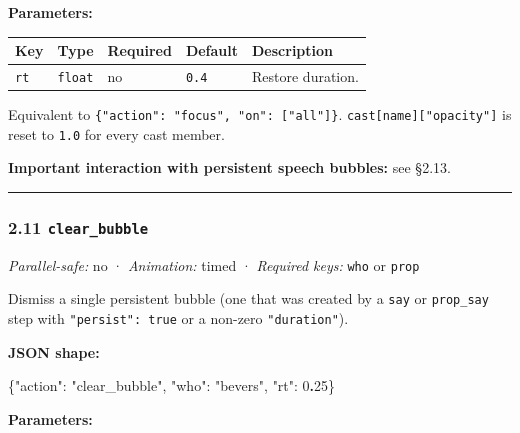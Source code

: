 \documentclass[
  12pt,
  letterpaper,
]{book}
\newenvironment{Shaded}{}{}
\newcommand{\DataTypeTok}[1]{\textcolor[rgb]{0.56,0.13,0.00}{#1}}
\newcommand{\DecValTok}[1]{\textcolor[rgb]{0.25,0.63,0.44}{#1}}
\newcommand{\ErrorTok}[1]{\textcolor[rgb]{1.00,0.00,0.00}{\textbf{#1}}}
\newcommand{\FunctionTok}[1]{\textcolor[rgb]{0.02,0.16,0.49}{#1}}
\newcommand{\StringTok}[1]{\textcolor[rgb]{0.25,0.44,0.63}{#1}}
\begin{document}
\textbf{Parameters:}

\begin{longtable}[]{@{}lllll@{}}
\toprule\noalign{}
Key & Type & Required & Default & Description \\
\midrule\noalign{}
\endhead
\bottomrule\noalign{}
\endlastfoot
\texttt{rt} & \texttt{float} & no & \texttt{0.4} & Restore duration. \\
\end{longtable}

Equivalent to \texttt{\{"action":\ "focus",\ "on":\ {[}"all"{]}\}}.
\texttt{cast{[}name{]}{[}"opacity"{]}} is reset to \texttt{1.0} for
every cast member.

\textbf{Important interaction with persistent speech bubbles:} see
§2.13.

\begin{center}\rule{0.5\linewidth}{0.5pt}\end{center}

\subsubsection{\texorpdfstring{2.11
\texttt{clear\_bubble}}{2.11 clear\_bubble}}\label{clear_bubble}

\emph{Parallel-safe:} no · \emph{Animation:} timed · \emph{Required
keys:} \texttt{who} or \texttt{prop}

Dismiss a single persistent bubble (one that was created by a
\texttt{say} or \texttt{prop\_say} step with \texttt{"persist":\ true}
or a non-zero \texttt{"duration"}).

\textbf{JSON shape:}

\begin{Shaded}
\begin{Highlighting}[]
\FunctionTok{\{}\DataTypeTok{"action"}\FunctionTok{:} \StringTok{"clear\_bubble"}\FunctionTok{,} \DataTypeTok{"who"}\FunctionTok{:} \StringTok{"bevers"}\FunctionTok{,} \DataTypeTok{"rt"}\FunctionTok{:} \DecValTok{0}\ErrorTok{.}\DecValTok{25}\FunctionTok{\}}
\end{Highlighting}
\end{Shaded}

\textbf{Parameters:}
\end{document}

